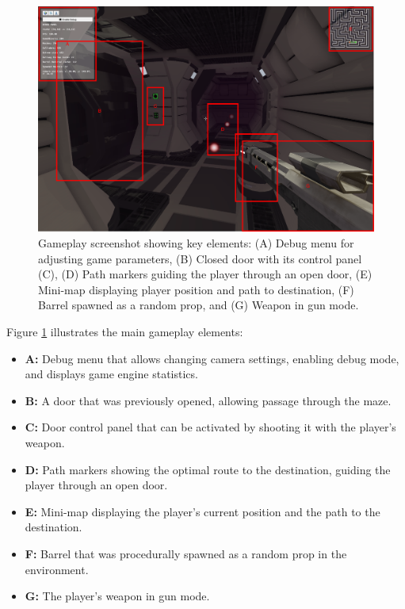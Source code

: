 \documentclass{article}
\begin{document}
\begin{figure}[H]
    \centering
    \includegraphics[width=\textwidth]{diagrams/screenshot.png}
    \caption{Gameplay screenshot showing key elements: (A) Debug menu for adjusting game parameters, (B) Closed door with its control panel (C), (D) Path markers guiding the player through an open door, (E) Mini-map displaying player position and path to destination, (F) Barrel spawned as a random prop, and (G) Weapon in gun mode.}
    \label{fig:gameplay-overview}
\end{figure}

Figure \ref{fig:gameplay-overview} illustrates the main gameplay elements:
\begin{itemize}
    \item \textbf{A:} Debug menu that allows changing camera settings, enabling debug mode, and displays game engine statistics.
    \item \textbf{B:} A door that was previously opened, allowing passage through the maze.
    \item \textbf{C:} Door control panel that can be activated by shooting it with the player's weapon.
    \item \textbf{D:} Path markers showing the optimal route to the destination, guiding the player through an open door.
    \item \textbf{E:} Mini-map displaying the player's current position and the path to the destination.
    \item \textbf{F:} Barrel that was procedurally spawned as a random prop in the environment.
    \item \textbf{G:} The player's weapon in gun mode.
\end{itemize}
\end{document}
